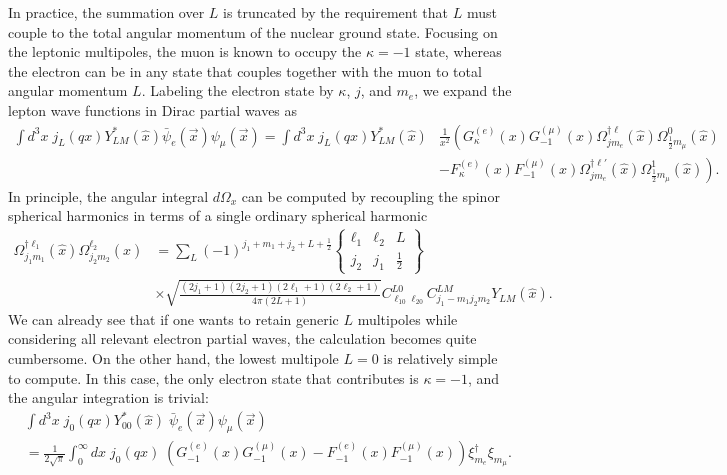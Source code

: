 \documentclass[12pt,letterpaper]{book}
\begin{document}
In practice, the summation over $L$ is truncated by the requirement that $L$ must couple to the total angular momentum of the nuclear ground state. Focusing on the leptonic multipoles, the muon is known to occupy the $\kappa=-1$ state, whereas the electron can be in any state that couples together with the muon to total angular momentum $L$. Labeling the electron state by $\kappa$, $j$, and $m_e$, we expand the lepton wave functions in Dirac partial waves as
\begin{equation}
\begin{split}
\int d^3x\;j_L(qx)Y^*_{LM}(\hat{x})\bar{\psi}_e(\vec{x})\psi_{\mu}(\vec{x})=\int d^3x\;j_L(qx)Y^*_{LM}(\hat{x})&\frac{1}{x^2}\left(G_\kappa^{(e)}(x)G_{-1}^{(\mu)}(x)\Omega^{\dag\ell}_{jm_e}(\hat{x})\Omega^0_{\frac{1}{2}m_{\mu}}(\hat{x})\right.\\
&\left.-F^{(e)}_\kappa(x)F_{-1}^{(\mu)}(x)\Omega^{\dag\ell'}_{jm_e}(\hat{x})\Omega^1_{\frac{1}{2}m_{\mu}}(\hat{x})\right).
\end{split}
\end{equation}
In principle, the angular integral $d\Omega_x$ can be computed by recoupling the spinor spherical harmonics in terms of a single ordinary spherical harmonic
\begin{equation}
\begin{split}
\Omega^{\dag\ell_1}_{j_1m_1}(\hat{x})\Omega^{\ell_2}_{j_2m_2}(\hat{x})&=\sum_L (-1)^{j_1+m_1+j_2+L+\frac{1}{2}}\left\{\begin{array}{ccc}
\ell_1 & \ell_2 & L\\
j_2 & j_1 & \frac{1}{2}
\end{array}\right\}\\
&\times\sqrt{\frac{(2j_1+1)(2j_2+1)(2\ell_1+1)(2\ell_2+1)}{4\pi(2L+1)}}C^{L0}_{\ell_10\ell_20}C^{LM}_{j_1-m_1j_2m_2}Y_{LM}(\hat{x}).
\end{split}
\end{equation}
We can already see that if one wants to retain generic $L$ multipoles while considering all relevant electron partial waves, the calculation becomes quite cumbersome. On the other hand, the lowest multipole $L=0$ is relatively simple to compute. In this case, the only electron state that contributes is $\kappa=-1$, and the angular integration is trivial:
\begin{equation}
\begin{split}
&\int d^3x\;j_0(qx)Y^*_{00}(\hat{x})\;\bar{\psi}_e(\vec{x})\psi_{\mu}(\vec{x})\\
&=\frac{1}{2\sqrt{\pi}}\int_0^{\infty}dx\;j_0(qx)\;\left(G^{(e)}_{-1}(x)G^{(\mu)}_{-1}(x)-F_{-1}^{(e)}(x)F_{-1}^{(\mu)}(x)\right)\xi^{\dag}_{m_e}\xi_{m_{\mu}}.
\end{split}
\end{equation} 
\end{document}
